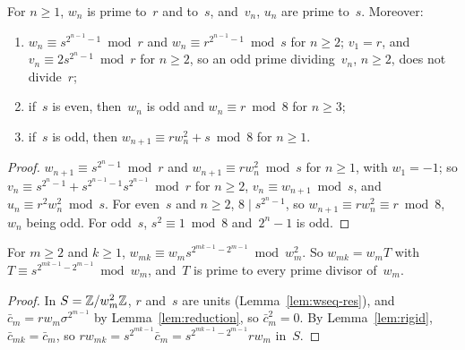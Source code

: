 \begin{lemma}
  \label{lem:wseq-res}
  \leanok
  For $n \ge 1$, $w_n$ is prime to~$r$ and to~$s$, and~$v_n$, $u_n$ are prime to~$s$. Moreover:
  \begin{enumerate}
    \item $w_n \equiv s^{2^{n-1} - 1} \bmod r$ and $w_n \equiv r^{2^{n-1}-1} \bmod s$ for
          $n \ge 2$; $v_1 = r$, and $v_n \equiv 2 s^{2^n - 1} \bmod r$ for $n \ge 2$, so an odd
          prime dividing~$v_n$, $n \ge 2$, does not divide~$r$;
    \item if~$s$ is even, then~$w_n$ is odd and $w_n \equiv r \bmod 8$ for $n \ge 3$;
    \item if~$s$ is odd, then $w_{n+1} \equiv r w_n^2 + s \bmod 8$ for $n \ge 1$.
  \end{enumerate}
\end{lemma}
\begin{proof}
  \leanok
  $w_{n+1} \equiv s^{2^n - 1} \bmod r$ and $w_{n+1} \equiv r w_n^2 \bmod s$ for $n \ge 1$, with
  $w_1 = -1$; so $v_n \equiv s^{2^n - 1} + s^{2^{n-1} - 1} s^{2^{n-1}} \bmod r$ for $n \ge 2$,
  $v_n \equiv w_{n+1} \bmod s$, and $u_n \equiv r^2 w_n^2 \bmod s$. For even~$s$ and $n \ge 2$,
  $8 \mid s^{2^n - 1}$, so $w_{n+1} \equiv r w_n^2 \equiv r \bmod 8$, $w_n$ being odd. For
  odd~$s$, $s^2 \equiv 1 \bmod 8$ and~$2^n - 1$ is odd.
\end{proof}

\begin{lemma}
  \label{lem:wseq-mul}
  \leanok
  For $m \ge 2$ and $k \ge 1$, $w_{mk} \equiv w_m s^{2^{mk-1} - 2^{m-1}} \bmod w_m^2$. So
  $w_{mk} = w_m T$ with $T \equiv s^{2^{mk-1} - 2^{m-1}} \bmod w_m$, and~$T$ is prime to every
  prime divisor of~$w_m$.
\end{lemma}
\begin{proof}
  \leanok
  In $S = \mathbb{Z}/w_m^2\mathbb{Z}$, $r$ and~$s$ are units (Lemma~\ref{lem:wseq-res}), and
  $\bar c_m = r w_m \sigma^{2^{m-1}}$ by Lemma~\ref{lem:reduction}, so $\bar c_m^2 = 0$. By
  Lemma~\ref{lem:rigid}, $\bar c_{mk} = \bar c_m$, so
  $r w_{mk} = s^{2^{mk-1}} \bar c_m = s^{2^{mk-1} - 2^{m-1}} r w_m$ in~$S$.
\end{proof}

